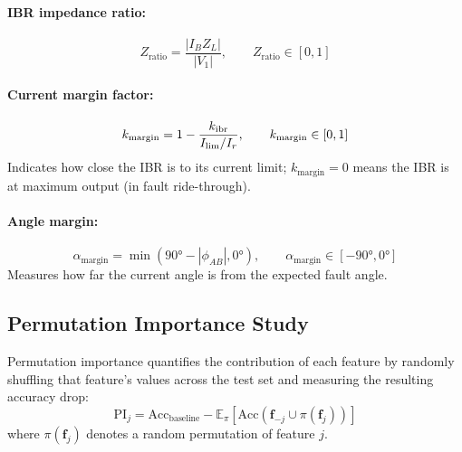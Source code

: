 \paragraph{IBR impedance ratio:}
\begin{equation}
  Z_\mathrm{ratio} = \frac{|I_B Z_L|}{|V_1|}, \qquad Z_\mathrm{ratio} \in [0, 1]
  \label{eq:ch8_zratio}
\end{equation}

\paragraph{Current margin factor:}
\begin{equation}
  k_\mathrm{margin} = 1 - \frac{k_{\mathrm{ibr}}}{I_\mathrm{lim}/I_r}, \qquad
  k_\mathrm{margin} \in [0, 1]
  \label{eq:ch8_kmargin}
\end{equation}
Indicates how close the IBR is to its current limit; $k_\mathrm{margin} = 0$
means the IBR is at maximum output (in fault ride-through).

\paragraph{Angle margin:}
\begin{equation}
  \alpha_\mathrm{margin} = \min(90° - |\phi_{AB}|, 0°), \qquad
  \alpha_\mathrm{margin} \in [-90°, 0°]
  \label{eq:ch8_amargin}
\end{equation}
Measures how far the current angle is from the expected fault angle.

\subsection{Permutation Importance Study}

Permutation importance quantifies the contribution of each feature by
randomly shuffling that feature's values across the test set and measuring
the resulting accuracy drop:
\begin{equation}
  \mathrm{PI}_j = \mathrm{Acc}_\mathrm{baseline}
    - \mathbb{E}_\pi[\mathrm{Acc}(\mathbf{f}_{-j} \cup \pi(\mathbf{f}_j))]
  \label{eq:ch8_pi}
\end{equation}
where $\pi(\mathbf{f}_j)$ denotes a random permutation of feature $j$.


